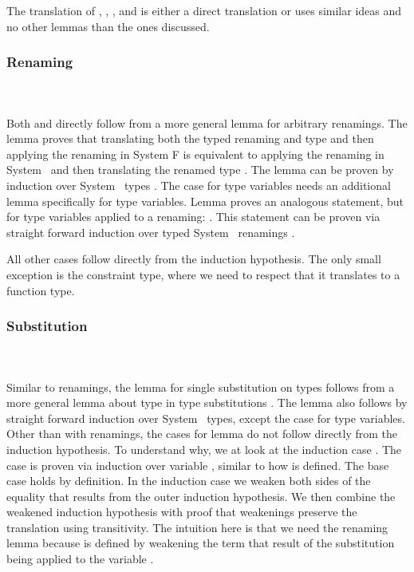 \noindent The translation of , , ,  and  is either a direct translation or uses similar ideas and no other lemmas than the ones discussed.

\subsubsection{Renaming}\hfill\\\\
Both  and  directly follow from a more general lemma  for arbitrary renamings. 
The lemma  proves that translating both the typed renaming  and type  and then applying the renaming in System F is equivalent to applying the renaming  in System \Fo\ and then translating the renamed type . 
The lemma can be proven by induction over System \Fo\ types .
\DPTTypePresRen
The case for type variables needs an additional lemma  specifically for type variables.
Lemma  proves an analogous statement, but for type variables applied to a renaming: \DPTVarPresRen. 
This statement can be proven via straight forward induction over typed System \Fo\ renamings .

\noindent All other cases follow directly from the induction hypothesis. 
The only small exception is the constraint type, where we need to respect that it translates to a function type.

\subsubsection{Substitution}\hfill\\\\
Similar to renamings, the lemma for single substitution on types  follows from a more general lemma about type in type substitutions .
The lemma  also follows by straight forward induction over System \Fo\ types, except the case for type variables. 
Other than with renamings, the cases for lemma  do not follow directly from the induction hypothesis. 
To understand why, we at look at the induction case .
\DPTVarPresSub
The case  is proven via induction over variable , similar to how  is defined. 
The base case holds by definition. 
In the induction case we weaken both sides of the equality that results from the outer induction hypothesis. 
We then combine the weakened induction hypothesis with proof that weakenings preserve the translation using transitivity. 
The intuition here is that we need the renaming lemma  because  is defined by weakening the term that result of the substitution  being applied to the variable .

